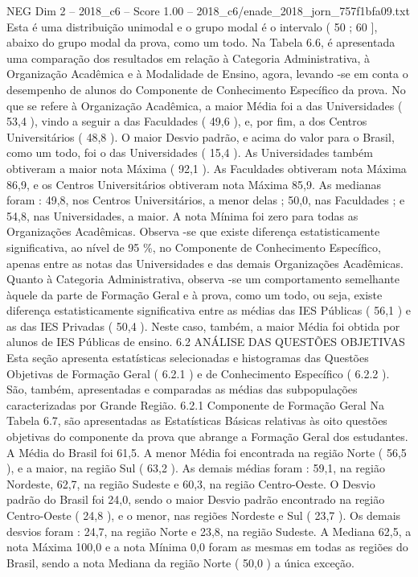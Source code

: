 \begin{textsample}{NEG Dim 2 – 2018\_c6 – Score 1.00 – 2018\_c6/enade\_2018\_jorn\_757f1bfa09.txt}
Esta é uma distribuição unimodal e o grupo modal é o intervalo ( 50 ; 60 ], abaixo do grupo modal da prova, como um todo.
Na Tabela 6.6, é apresentada uma comparação dos resultados em relação à Categoria Administrativa, à Organização Acadêmica e à Modalidade de Ensino, agora, levando -se em conta o desempenho de alunos do Componente de Conhecimento Específico da prova.
No que se refere à Organização Acadêmica, a maior Média foi a das Universidades ( 53,4 ), vindo a seguir a das Faculdades ( 49,6 ), e, por fim, a dos Centros Universitários ( 48,8 ).
O maior Desvio padrão, e acima do valor para o Brasil, como um todo, foi o das Universidades ( 15,4 ).
As Universidades também obtiveram a maior nota Máxima ( 92,1 ).
As Faculdades obtiveram nota Máxima 86,9, e os Centros Universitários obtiveram nota Máxima 85,9.
As medianas foram : 49,8, nos Centros Universitários, a menor delas ; 50,0, nas Faculdades ; e 54,8, nas Universidades, a maior.
A nota Mínima foi zero para todas as Organizações Acadêmicas.
Observa -se que existe diferença estatisticamente significativa, ao nível de 95 \%, no Componente de Conhecimento Específico, apenas entre as notas das Universidades e das demais Organizações Acadêmicas.
Quanto à Categoria Administrativa, observa -se um comportamento semelhante àquele da parte de Formação Geral e à prova, como um todo, ou seja, existe diferença estatisticamente significativa entre as médias das IES Públicas ( 56,1 ) e as das IES Privadas ( 50,4 ).
Neste caso, também, a maior Média foi obtida por alunos de IES Públicas de ensino. 6.2 ANÁLISE DAS QUESTÕES OBJETIVAS Esta seção apresenta estatísticas selecionadas e histogramas das Questões Objetivas de Formação Geral ( 6.2.1 ) e de Conhecimento Específico ( 6.2.2 ).
São, também, apresentadas e comparadas as médias das subpopulações caracterizadas por Grande Região. 6.2.1 Componente de Formação Geral Na Tabela 6.7, são apresentadas as Estatísticas Básicas relativas às oito questões objetivas do componente da prova que abrange a Formação Geral dos estudantes.
A Média do Brasil foi 61,5.
A menor Média foi encontrada na região Norte ( 56,5 ), e a maior, na região Sul ( 63,2 ).
As demais médias foram : 59,1, na região Nordeste, 62,7, na região Sudeste e 60,3, na região Centro-Oeste.
O Desvio padrão do Brasil foi 24,0, sendo o maior Desvio padrão encontrado na região Centro-Oeste ( 24,8 ), e o menor, nas regiões Nordeste e Sul ( 23,7 ).
Os demais desvios foram : 24,7, na região Norte e 23,8, na região Sudeste.
A Mediana 62,5, a nota Máxima 100,0 e a nota Mínima 0,0 foram as mesmas em todas as regiões do Brasil, sendo a nota Mediana da região Norte ( 50,0 ) a única exceção.

\end{textsample}
